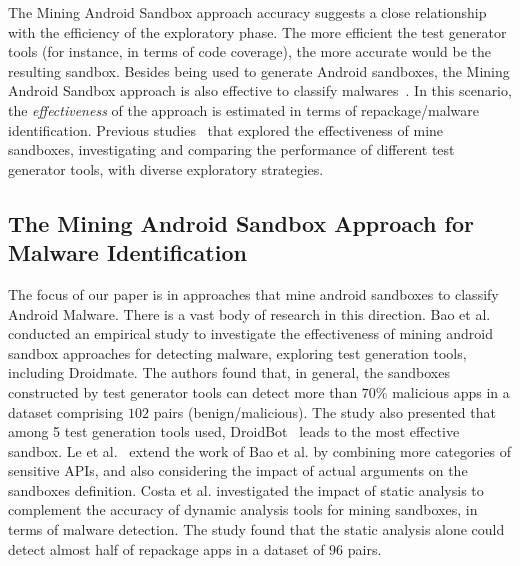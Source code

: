 The Mining Android Sandbox approach accuracy suggests a close relationship with the
efficiency of the exploratory phase. The more efficient the test generator
tools (for instance, in terms of code coverage), the more accurate would be the resulting
sandbox. Besides being used to generate Android sandboxes, the Mining Android Sandbox approach is also effective 
to classify malwares~\cite{DBLP:conf/wcre/BaoLL18}.  In this scenario, the \emph{effectiveness} of the approach
is estimated in terms of repackage/malware identification.
Previous studies~\cite{DBLP:conf/wcre/BaoLL18,DBLP:conf/scam/CostaMCMVBC20} that explored the effectiveness of mine sandboxes,
investigating and comparing the performance of different test generator tools,
with diverse exploratory strategies.

\subsection{The Mining Android Sandbox Approach for Malware Identification}

The focus of our paper is in approaches that mine android sandboxes to classify Android Malware.
There is a vast body of research in this direction. 
Bao et al.~\cite{DBLP:conf/wcre/BaoLL18} conducted an empirical study to investigate the effectiveness of mining android sandbox
approaches
for detecting malware, exploring test generation tools, including Droidmate. The authors found that, in general, the sandboxes constructed by test generator tools can detect more than $70$\% malicious apps in a dataset comprising $102$ pairs (benign/malicious). The study also presented that among 5 test generation tools used, DroidBot~\cite{DBLP:conf/icse/LiYGC17} leads to the most effective sandbox.
Le et al.~\cite{le2018towards} extend the work of Bao et al. by combining more categories of sensitive APIs, and also considering the impact of
actual arguments on the sandboxes definition. Costa et al.\cite{DBLP:journals/jss/CostaMMSSBNR22} investigated the impact of static analysis to complement the accuracy of dynamic analysis tools for mining sandboxes, in terms of malware detection. The study found that the static analysis alone could detect almost half of repackage apps in a dataset of $96$ pairs.



